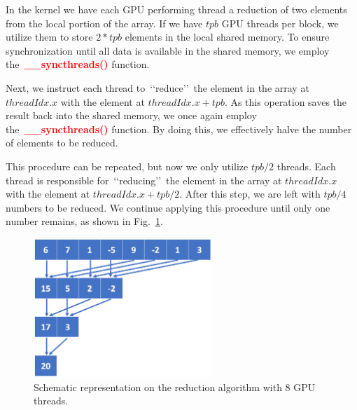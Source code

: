 




\par
In the kernel we have each GPU performing thread a reduction of two elements from the local portion of the array.
If we have $tpb$ GPU threads per block, we utilize them to store $2 * tpb$ elements in the local shared memory.
To ensure synchronization until all data is available in the shared memory, we employ the~\textbf{\textcolor{red}{\_\_syncthreads()}} function.


\par
Next, we instruct each thread to~\lq\lq reduce\rq\rq~the element in the array at $threadIdx.x$ with the element at $threadIdx.x + tpb$.
As this operation saves the result back into the shared memory, we once again employ the~\textbf{\textcolor{red}{\_\_syncthreads()}} function.
By doing this, we effectively halve the number of elements to be reduced.


\par
This procedure can be repeated, but now we only utilize $tpb / 2$ threads.
Each thread is responsible for~\lq\lq reducing\rq\rq~the element in the array at $threadIdx.x$ with the element at $threadIdx.x + tpb / 2$.
After this step, we are left with $tpb / 4$ numbers to be reduced.
We continue applying this procedure until only one number remains, as shown in Fig.~\ref{fig:reduction}.


\begin{figure}[htbp]
\centering\includegraphics[width=0.6\textwidth]{fig_problem/reduction.png}
\caption{Schematic representation on the reduction algorithm with 8 GPU threads.}\label{fig:reduction}
\end{figure}


